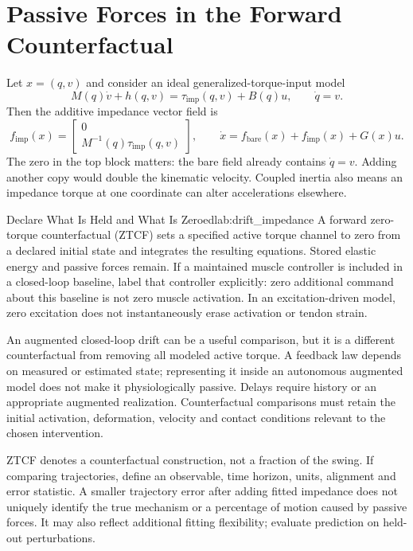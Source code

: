 \section{Passive Forces in the Forward Counterfactual}
\label{sec:passive_ztcf}

Let $x=(q,v)$ and consider an ideal generalized-torque-input model
\[
M(q)\dot v+h(q,v)=\tau_{\mathrm{imp}}(q,v)+B(q)u,
\qquad \dot q=v.
\]
Then the additive impedance vector field is
\[
f_{\mathrm{imp}}(x)=\begin{bmatrix}0\\M^{-1}(q)\tau_{\mathrm{imp}}(q,v)\end{bmatrix},
\qquad
\dot x=f_{\mathrm{bare}}(x)+f_{\mathrm{imp}}(x)+G(x)u.
\]
The zero in the top block matters: the bare field already contains $\dot q=v$. Adding another copy would double the kinematic velocity. Coupled inertia also means an impedance torque at one coordinate can alter accelerations elsewhere.

\begin{definition}{Declare What Is Held and What Is Zeroed}{lab:drift_impedance}
A forward zero-torque counterfactual (ZTCF) sets a specified active torque channel to zero from a declared initial state and integrates the resulting equations. Stored elastic energy and passive forces remain. If a maintained muscle controller is included in a closed-loop baseline, label that controller explicitly: zero additional command about this baseline is not zero muscle activation. In an excitation-driven model, zero excitation does not instantaneously erase activation or tendon strain.
\end{definition}

An augmented closed-loop drift can be a useful comparison, but it is a different counterfactual from removing all modeled active torque. A feedback law depends on measured or estimated state; representing it inside an autonomous augmented model does not make it physiologically passive. Delays require history or an appropriate augmented realization. Counterfactual comparisons must retain the initial activation, deformation, velocity and contact conditions relevant to the chosen intervention.

ZTCF denotes a counterfactual construction, not a fraction of the swing. If comparing trajectories, define an observable, time horizon, units, alignment and error statistic. A smaller trajectory error after adding fitted impedance does not uniquely identify the true mechanism or a percentage of motion caused by passive forces. It may also reflect additional fitting flexibility; evaluate prediction on held-out perturbations.

